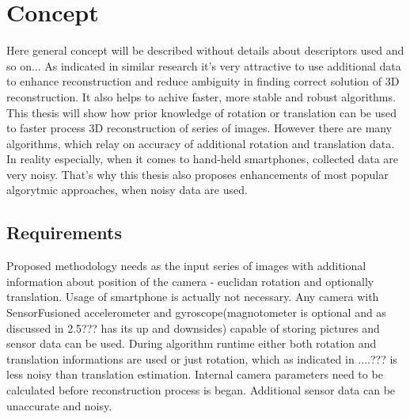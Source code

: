 
\chapter{Concept} %
Here general concept will be described without details about descriptors used and so on...
As indicated in similar research it's very attractive to use additional data to enhance reconstruction and reduce ambiguity in finding correct solution of 3D reconstruction. It also helps to achive faster, more stable and robust algorithms. This thesis will show how prior knowledge of rotation or translation can be used to faster process 3D reconstruction of series of images. 
However there are many algorithms, which relay on accuracy of additional rotation and translation data. In reality especially, when it comes to hand-held smartphones, collected data are very noisy. That's why this thesis also proposes enhancements of most popular algorytmic approaches, when noisy data are used.

\section{Requirements}
Proposed methodology needs as the input series of images with additional information about position of the camera - euclidan rotation and optionally translation. Usage of smartphone is actually not necessary. Any camera with SensorFusioned accelerometer and gyroscope(magnotometer is optional and as discussed in 2.5??? has its up and downsides) capable of storing pictures and sensor data can be  used. During algorithm runtime either both rotation and translation informations are used or just rotation, which as indicated in ....??? is less noisy than translation estimation. Internal camera parameters need to be calculated before reconstruction process is began. Additional sensor data can be unaccurate and noisy.
